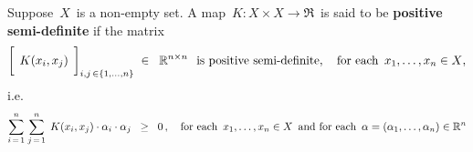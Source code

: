 \vskip 0.5cm
\begin{definition}
\mbox{}
\vskip 0.1cm
\noindent
Suppose \,$X$\, is a non-empty set.
A map \,$K : X \times X \longrightarrow \Re$\, is said to be \textbf{positive semi-definite}
if the matrix 
\begin{equation*}
\left[\;\, \overset{{\color{white}-}}{K}(x_{i},x_{j}) \,\;\right]_{i,j\,\in\{1,\ldots,n\}}
\; \in \;\; \Re^{n \times n}
\;\;\,\textnormal{is positive semi-definite},
\quad
\textnormal{for each \,$x_{1},\ldots,x_{n} \in X$},
\end{equation*}
i.e.
\begin{equation*}
\overset{n}{\underset{i\,=\,1}{\sum}}\;
\overset{n}{\underset{j\,=\,1}{\sum}}\;\,
K(x_{i},x_{j}) \cdot \alpha_{i} \cdot \alpha_{j}
\;\; \geq \;\; 0\,,
\quad
\textnormal{for each \,$x_{1},\ldots,x_{n} \in X$\, and for each \,$\alpha = (\alpha_{1},\ldots,\alpha_{n})\in\Re^{n}$}
\end{equation*}
\end{definition}


